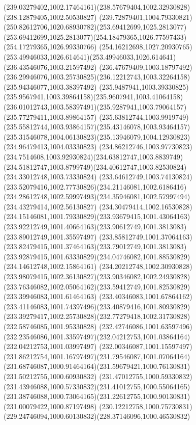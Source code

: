 {{\curveto(239.03279402,1002.17464161)(238.57679404,1002.32930828)(238.12879405,1002.50530827)
\curveto(239.72879401,1004.79330821)(250.82612706,1020.68930782)(253.69412699,1025.2813077)
\curveto(253.69412699,1025.2813077)(254.18479365,1026.77597433)(254.17279365,1026.99330766)
\curveto(254.16212698,1027.20930765)(253.49946033,1026.614641)(253.49946033,1026.614641)
\lineto(236.43546076,1003.21597492)
\lineto(236.47679409,1003.18797492)
\curveto(236.29946076,1003.25730825)(236.12212743,1003.32264158)(235.94346077,1003.38397492)
\curveto(235.9487941,1003.39330825)(235.9567941,1003.39864158)(235.9607941,1003.41064158)
\curveto(236.01012743,1003.58397491)(235.9287941,1003.79064157)(235.77279411,1003.89864157)
\curveto(235.63812744,1003.9919749)(235.55812744,1003.93864157)(235.43146078,1003.93464157)
\curveto(235.31546078,1004.06130823)(235.13946079,1004.12930823)(234.96479413,1004.03330823)
\curveto(234.86212746,1003.97730823)(234.7514608,1003.92930824)(234.63812747,1003.8839749)
\curveto(234.51812747,1003.8799749)(234.40612747,1003.82530824)(234.33012748,1003.73330824)
\curveto(233.64612749,1003.74130824)(233.52079416,1002.77730826)(234.21146081,1002.6186416)
\curveto(234.28612748,1002.59997493)(234.35946081,1002.57997494)(234.43279414,1002.56130827)
\curveto(234.30479414,1002.16530828)(234.15146081,1001.79330829)(233.93679415,1001.43064163)
\curveto(233.92212749,1001.40664163)(233.90612749,1001.3813083)(233.89012749,1001.35597497)
\curveto(233.85812749,1001.37064163)(233.82479415,1001.37464163)(233.79012749,1001.3813083)
\curveto(233.92879415,1001.63330829)(234.04746082,1001.88530829)(234.14612748,1002.15864161)
\curveto(234.20212748,1002.30930828)(233.98079415,1002.36130827)(233.90346082,1002.24930828)
\curveto(233.76346082,1002.05064162)(233.59412749,1001.82530829)(233.39946083,1001.61464163)
\curveto(233.40346083,1001.67864162)(233.41146083,1001.74397496)(233.40879416,1001.80930829)
\curveto(233.39279417,1002.25730828)(232.77279418,1002.31730828)(232.58746085,1001.95330828)
\curveto(232.42746086,1001.63597496)(232.23546086,1001.33597497)(232.04212753,1001.03864164)
\lineto(232.04212753,1001.03997497)
\curveto(232.00346087,1001.15597497)(231.86212754,1001.16797497)(231.79546087,1001.07064164)
\curveto(231.68746087,1000.91464164)(231.59679421,1000.76130831)(231.50212755,1000.60930832)
\curveto(231.47012755,1000.59330832)(231.43946088,1000.57330832)(231.41012755,1000.55064165)
\curveto(231.38746088,1000.73064165)(231.22612755,1000.90130831)(231.00079422,1000.87197498)
\curveto(230.12212758,1000.75730831)(229.24746094,1000.60130832)(228.37146096,1000.46530832)
}}
